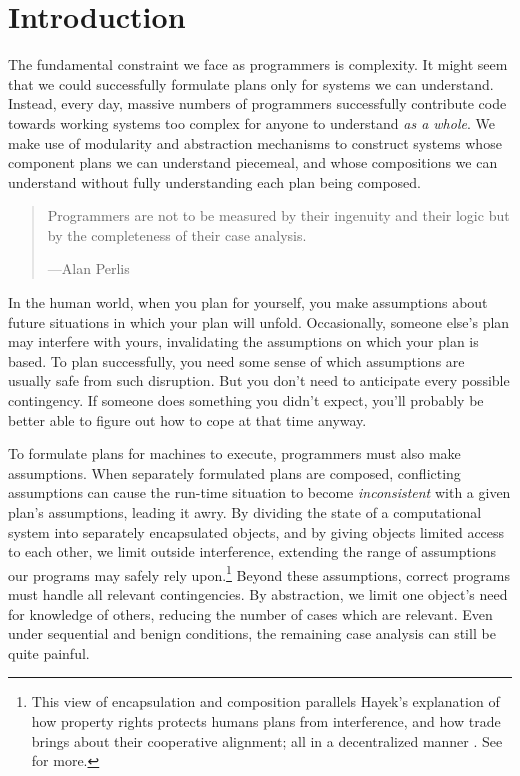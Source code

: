 \documentclass{llncs}
\begin{document}
\section{Introduction}

The fundamental constraint we face as programmers is complexity. It
might seem that we could successfully formulate plans only for systems
we can understand. Instead, every day, massive numbers of programmers
successfully contribute code towards working systems too complex for
anyone to understand \emph{as a whole}. We make use of modularity and
abstraction mechanisms to construct systems whose component plans we
can understand piecemeal, and whose compositions we can understand
without fully understanding each plan being composed.
%
\begin{quote}
Programmers are not to be measured by their ingenuity and their logic
but by the completeness of their case analysis.
\begin{flushright}
---Alan Perlis
\end{flushright}
\end{quote}
%
In the human world, when you plan for yourself, you make assumptions
about future situations in which your plan will unfold. Occasionally,
someone else's plan may interfere with yours, invalidating the
assumptions on which your plan is based. To plan successfully, you
need some sense of which assumptions are usually safe from such
disruption. But you don't need to anticipate every possible
contingency. If someone does something you didn't expect, you'll
probably be better able to figure out how to cope at that time anyway.

To formulate plans for machines to execute, programmers must also make
assumptions. When separately formulated plans are composed,
conflicting assumptions can cause the run-time situation to become
\emph{inconsistent} with a given plan's assumptions, leading it
awry. By dividing the state of a computational system into separately
encapsulated objects, and by giving objects limited access to each
other, we limit outside interference, extending the range of
assumptions our programs may safely rely upon.\footnote{
%
This view of encapsulation and composition parallels Hayek's
explanation of how property rights protects humans plans from
interference, and how trade brings about their cooperative alignment;
all in a decentralized manner \cite{Hayek:1945:UKS}. See
\cite{miller:agoric,tulloh:abstraction} for more.}
%
Beyond these assumptions, correct programs must handle all relevant
contingencies. By abstraction, we limit one object's need for
knowledge of others, reducing the number of cases which are
relevant. Even under sequential and benign conditions, the remaining
case analysis can still be quite painful.
\end{document}
